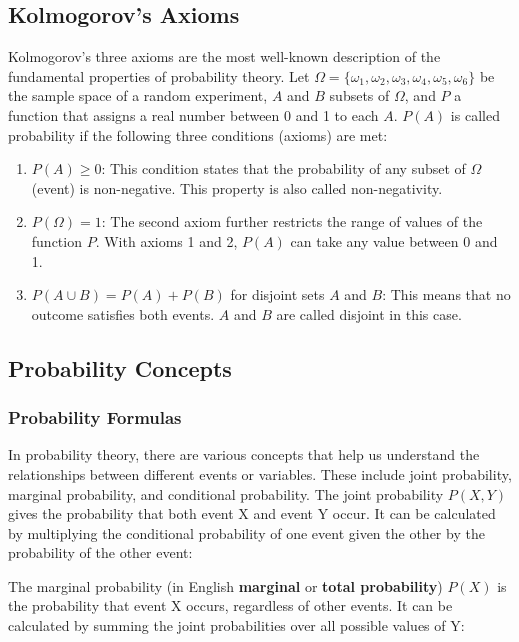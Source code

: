 \subsection{Kolmogorov's Axioms}\label{Kolmogorov's Axioms}
Kolmogorov's three axioms are the most well-known description of the fundamental properties of probability theory. Let $\Omega = \{\omega_1, \omega_2, \omega_3, \omega_4, \omega_5, \omega_6\}$ be the sample space of a random experiment, $A$ and $B$ subsets of $\Omega$, and $P$ a function that assigns a real number between 0 and 1 to each $A$. $P(A)$ is called probability if the following three conditions (axioms) are met:
\begin{enumerate}
    \item $P(A) \geq 0$: This condition states that the probability of any subset of $\Omega$ (event) is non-negative. This property is also called non-negativity.
    \item $P(\Omega) = 1$: The second axiom further restricts the range of values of the function $P$. With axioms 1 and 2, $P(A)$ can take any value between 0 and 1.
    \item $P(A \cup B) = P(A) + P(B)$ for disjoint sets $A$ and $B$: This means that no outcome satisfies both events. $A$ and $B$ are called disjoint in this case.
\end{enumerate}

\subsection{Probability Concepts}\label{Probability Concepts}

\subsubsection{Probability Formulas}\label{Probability Formulas}

In probability theory, there are various concepts that help us understand the relationships between different events or variables. These include joint probability, marginal probability, and conditional probability. The joint probability $P(X, Y)$ gives the probability that both event X and event Y occur. It can be calculated by multiplying the conditional probability of one event given the other by the probability of the other event:


The marginal probability (in English \textbf{marginal} or \textbf{total probability}) $P(X)$ is the probability that event X occurs, regardless of other events. It can be calculated by summing the joint probabilities over all possible values of Y:

